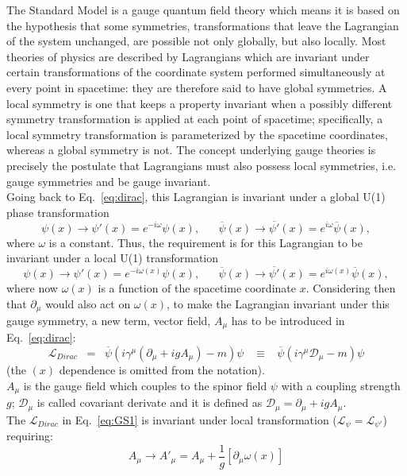 The Standard Model is a gauge quantum field theory which means it is based on the hypothesis that some symmetries, \ie transformations that leave the Lagrangian of the system unchanged, are possible not only globally, but also locally.
Most theories of physics are described by Lagrangians which are invariant under certain transformations of the coordinate system performed simultaneously at every point in spacetime: they are therefore said to have global symmetries. A local symmetry is one that keeps a property invariant when a possibly different symmetry transformation is applied at each point of spacetime; specifically, a local symmetry transformation is parameterized by the spacetime coordinates, whereas a global symmetry is not. The concept underlying gauge theories is precisely the postulate that Lagrangians must also possess local symmetries, i.e. gauge symmetries and be gauge invariant.\\
Going back to Eq.~\ref{eq:dirac}, this Lagrangian is invariant under a global U(1) phase transformation
\begin{equation}
\label{eq:globalT}
 \psi(x) \rightarrow \psi'(x) = e^{-i\omega} \psi(x), \; \; \; \; \; \;    \overline{\psi}(x) \rightarrow \overline{\psi'}(x) = e^{i\omega} \overline{\psi}(x),
\end{equation}
where $\omega$ is a constant. Thus, the requirement is for this Lagrangian to be invariant under a local U(1) transformation
\begin{equation}
\label{eq:localT}
 \psi(x) \rightarrow \psi'(x) = e^{-i\omega(x)} \psi(x), \; \; \; \; \; \;    \overline{\psi}(x) \rightarrow \overline{\psi'}(x) = e^{i\omega(x)} \overline{\psi}(x),
\end{equation}
where now $\omega(x)$ is a function of the spacetime coordinate $x$. Considering then that $\partial_{\mu}$ would also act on $\omega(x)$, to make the 
Lagrangian invariant under this gauge symmetry, a new term, vector field, $A_{\mu}$ has to be introduced in Eq.~\ref{eq:dirac}:
\begin{equation}
\label{eq:GS1}
 \mathcal{L}_{Dirac} \;\; = \;\; \overline{\psi} (i\gamma^{\mu} (\partial_{\mu} + igA_{\mu})-m) \psi \;\;\; \equiv  \;\;\; \overline{\psi} (i\gamma^{\mu}\mathcal{D}_{\mu}-m) \psi 
\end{equation}
(the $(x)$ dependence is omitted from the notation).\\
 $A_{\mu}$ is the gauge field which couples to the spinor field $\psi$ with a coupling strength $g$; $\mathcal{D}_{\mu}$ is called covariant derivate and it is defined as $\mathcal{D}_{\mu} = \partial_{\mu} + igA_{\mu}$. \\
The $\mathcal{L}_{Dirac}$ in Eq.~\ref{eq:GS1} is invariant under local transformation ($\mathcal{L}_{\psi} =\mathcal{L}_{\psi'}$) requiring:
\begin{equation}
\label{eq:GS2}
A_{\mu} \rightarrow A'_{\mu} =  A_{\mu} + \frac{1}{g}[\partial_{\mu} \omega(x)]
\end{equation}

